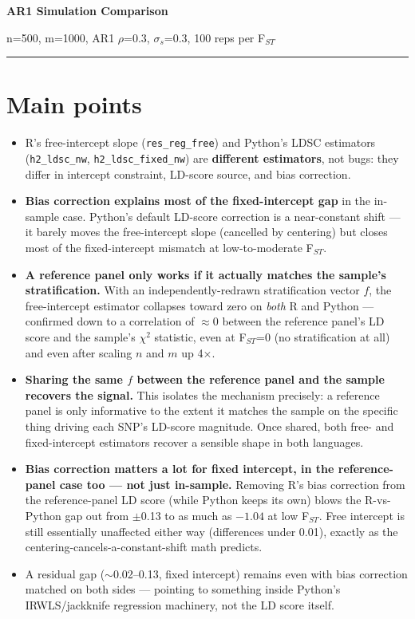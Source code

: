 \documentclass[10pt]{article}
\begin{document}
{\LARGE \bfseries AR1 Simulation Comparison}

\vspace{2pt}
{\color{inksoft} {\small\ttfamily n=500, m=1000, AR1 $\rho$=0.3, $\sigma_s$=0.3, 100 reps per F$_{ST}$}}

\vspace{3pt}
\noindent\rule{\linewidth}{0.4pt}

\section*{Main points}
\begin{itemize}[leftmargin=14pt, itemsep=1.5pt, topsep=1pt]
  \item R's free-intercept slope (\texttt{res\_reg\_free}) and Python's LDSC estimators (\texttt{h2\_ldsc\_nw}, \texttt{h2\_ldsc\_fixed\_nw}) are \textbf{different estimators}, not bugs: they differ in intercept constraint, LD-score source, and bias correction.
  \item \textbf{Bias correction explains most of the fixed-intercept gap} in the in-sample case. Python's default LD-score correction is a near-constant shift --- it barely moves the free-intercept slope (cancelled by centering) but closes most of the fixed-intercept mismatch at low-to-moderate F$_{ST}$.
  \item \textbf{A reference panel only works if it actually matches the sample's stratification.} With an independently-redrawn stratification vector $f$, the free-intercept estimator collapses toward zero on \emph{both} R and Python --- confirmed down to a correlation of $\approx$0 between the reference panel's LD score and the sample's $\chi^2$ statistic, even at F$_{ST}$=0 (no stratification at all) and even after scaling $n$ and $m$ up 4$\times$.
  \item \textbf{Sharing the same $f$ between the reference panel and the sample recovers the signal.} This isolates the mechanism precisely: a reference panel is only informative to the extent it matches the sample on the specific thing driving each SNP's LD-score magnitude. Once shared, both free- and fixed-intercept estimators recover a sensible shape in both languages.
  \item \textbf{Bias correction matters a lot for fixed intercept, in the reference-panel case too --- not just in-sample.} Removing R's bias correction from the reference-panel LD score (while Python keeps its own) blows the R-vs-Python gap out from $\pm$0.13 to as much as $-1.04$ at low F$_{ST}$. Free intercept is still essentially unaffected either way (differences under 0.01), exactly as the centering-cancels-a-constant-shift math predicts.
  \item A residual gap ($\sim$0.02--0.13, fixed intercept) remains even with bias correction matched on both sides --- pointing to something inside Python's IRWLS/jackknife regression machinery, not the LD score itself.
\end{itemize}
\end{document}
